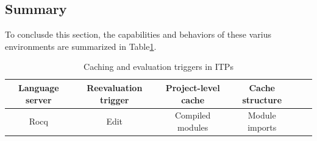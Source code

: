 \subsection{Summary}
To conclusde this section, the capabilities and behaviors
of these varius environments are summarized in Table\ref{tab:feats}.
\begin{table}[b]
	\centering
	\begin{center}
		\begin{tabular}{|c|c|c|c|c|c|}
			\hline
			Language server & Reevaluation trigger & Project-level cache & Cache structure \\ \hline
			Rocq & Edit & Compiled modules & Module imports \\ \hline
		\end{tabular}
	\end{center}
	\caption{Caching and evaluation triggers in ITPs}
	\label{tab:feats}
\end{table}
